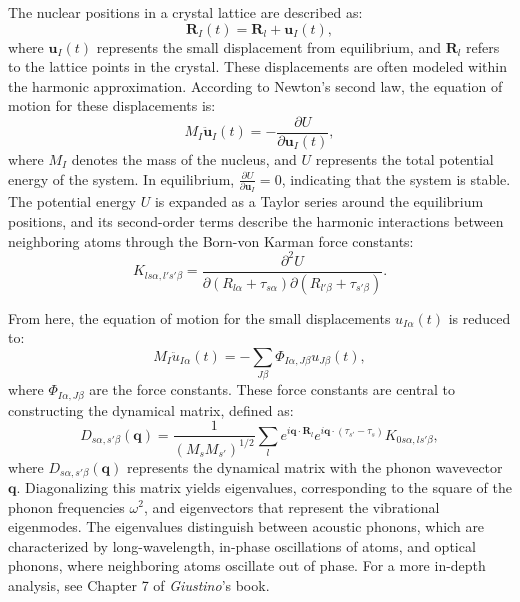 The nuclear positions in a crystal lattice are described as:
\begin{equation}
	\mathbf{R}_I(t) = \mathbf{R}_l + \mathbf{u}_I(t),
\end{equation}
where \( \mathbf{u}_I(t) \) represents the small displacement from equilibrium, and \( \mathbf{R}_l \) refers to the lattice points in the crystal. These displacements are often modeled within the harmonic approximation. According to Newton's second law, the equation of motion for these displacements is:
\begin{equation}
	M_I \ddot{\mathbf{u}}_I(t) = -\frac{\partial U}{\partial \mathbf{u}_I(t)},
\end{equation}
where \( M_I \) denotes the mass of the nucleus, and \( U \) represents the total potential energy of the system. In equilibrium, \( \frac{\partial U}{\partial \mathbf{u}_I} = 0 \), indicating that the system is stable. The potential energy \( U \) is expanded as a Taylor series around the equilibrium positions, and its second-order terms describe the harmonic interactions between neighboring atoms through the Born-von Karman force constants:
\begin{equation}
	K_{ls\alpha, l's'\beta} = \frac{\partial^2 U}{\partial (R_{l\alpha} + \tau_{s\alpha}) \partial (R_{l'\beta} + \tau_{s'\beta})}.
\end{equation}

From here, the equation of motion for the small displacements \( u_{I\alpha}(t) \) is reduced to:
\begin{equation}
	M_I \ddot{u}_{I\alpha}(t) = - \sum_{J\beta} \Phi_{I\alpha, J\beta} u_{J\beta}(t),
\end{equation}
where \( \Phi_{I\alpha, J\beta} \) are the force constants. These force constants are central to constructing the dynamical matrix, defined as:
\begin{equation}\label{eq:3.3}
	D_{s\alpha, s'\beta}(\mathbf{q}) = \frac{1}{(M_s M_{s'})^{1/2}} \sum_{l} e^{i\mathbf{q} \cdot \mathbf{R}_l} e^{i\mathbf{q} \cdot (\tau_{s'} - \tau_s)} K_{0s\alpha, ls'\beta},
\end{equation}
where \( D_{s\alpha, s'\beta}(\mathbf{q}) \) represents the dynamical matrix with the phonon wavevector \( \mathbf{q} \). Diagonalizing this matrix yields eigenvalues, corresponding to the square of the phonon frequencies \( \omega^2 \), and eigenvectors that represent the vibrational eigenmodes.  The eigenvalues distinguish between acoustic phonons, which are characterized by long-wavelength, in-phase oscillations of atoms, and optical phonons, where neighboring atoms oscillate out of phase. For a more in-depth analysis, see Chapter 7 of \textit{Giustino}'s book\supercite{Giustino2014}.

